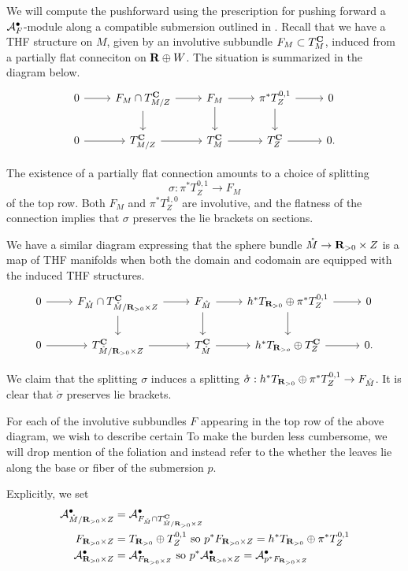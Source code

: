 We will compute the pushforward using the prescription for pushing forward a $\mathcal A^{\bullet}_{F}$-module along a compatible submersion outlined in \cite{KormanThesis}. Recall that we have a THF structure on $M$, given by an involutive subbundle $F_{M}\subset T^{\mathbf{C}}_{M}$, induced from a partially flat conneciton on $\mathbf{R}\oplus W$. The situation is summarized in the diagram below.
\[
  \begin{tikzcd}
    0 \ar[r] & F_{M}\cap T_{M/Z}^{\C}\ar[r]\ar[d] & F_{M}\ar[r]\ar[d]  & \pi^{*}T^{0,1}_{Z}\ar[r]\ar[d] & 0 \\
    0 \ar[r] & T_{M/Z}^{\C}\ar[r] & T_{M}^{\C}\ar[r] & T_{Z}^{\C}\ar[r] & 0.
  \end{tikzcd}
\]

The existence of a partially flat connection amounts to a choice of splitting \[\sigma: \pi^{*}T^{0,1}_{Z}\to F_{M}\] of the top row. Both $F_{M}$ and $\pi^{*}T^{1,0}_{Z}$ are involutive, and the flatness of the connection implies that $\sigma$ preserves the lie brackets on sections.

We have a similar diagram expressing that the sphere bundle $\mathring M \to \mathbf{R}_{>0}\times Z$ is a map of THF manifolds when both the domain and codomain are equipped with the induced THF structures.
\[
  \begin{tikzcd}
    0 \ar[r] & F_{\mathring M}\cap T_{\mathring M/\R_{>0}\times Z}^{\C}\ar[r]\ar[d] & F_{\mathring M}\ar[r]\ar[d]  & h^{*}T_{\R_{>0}}\oplus\pi^{*}T^{0,1}_{Z}\ar[r]\ar[d] & 0 \\
    0 \ar[r] & T_{\mathring M/\R_{>0}\times Z}^{\C}\ar[r] & T_{\mathring M}^{\C}\ar[r] & h^{*}T_{\R_{>o}}\oplus T_{Z}^{\C}\ar[r] & 0.
  \end{tikzcd}
\]


We claim that the splitting $\sigma$ induces a splitting $\mathring \sigma : h^{*}T_{\mathbf{R}_{>0}}\oplus \pi^{*}T^{0,1}_{Z}\to F_{\mathring M}$.  It is clear that $\mathring \sigma$ preserves lie brackets.

For each of the involutive subbundles $F$ appearing in the top row of the above diagram, we wish to describe certain  To make the burden less cumbersome, we will drop mention of the foliation and instead refer to the whether the leaves lie along the base or fiber of the submersion $p$.

Explicitly, we set
\begin{align*}
  \mathcal A^{\bullet}_{\mathring M/\mathbf{R}_{>0}\times Z} & = \mathcal A^{\bullet}_{F_{\mathring M}\cap T^{\mathbf{C}}_{\mathring M/ \mathbf{R}_{>0}\times Z}} \\
  F_{\mathbf{R}_{>0}\times Z} &  = T_{\mathbf{R}_{>0}}\oplus T^{0,1}_{Z} \text{ so }p^{*}F_{\mathbf{R}_{>0}\times Z} = h^{*}T_{\mathbf{R}_{>0}}\oplus \pi^{*}T^{0,1}_{Z} \\
  \mathcal A^{\bullet}_{\mathbf{R}_{>0}\times Z}&  = \mathcal A^{\bullet}_{F _{\mathbf{R}_{>0}\times Z}} \text{ so }p^{*}\mathcal A^{\bullet}_{\mathbf{R}_{>0}\times Z} = \mathcal A^{\bullet}_{p^{*}F _{\mathbf{R}_{>0}\times Z}}
\end{align*}

